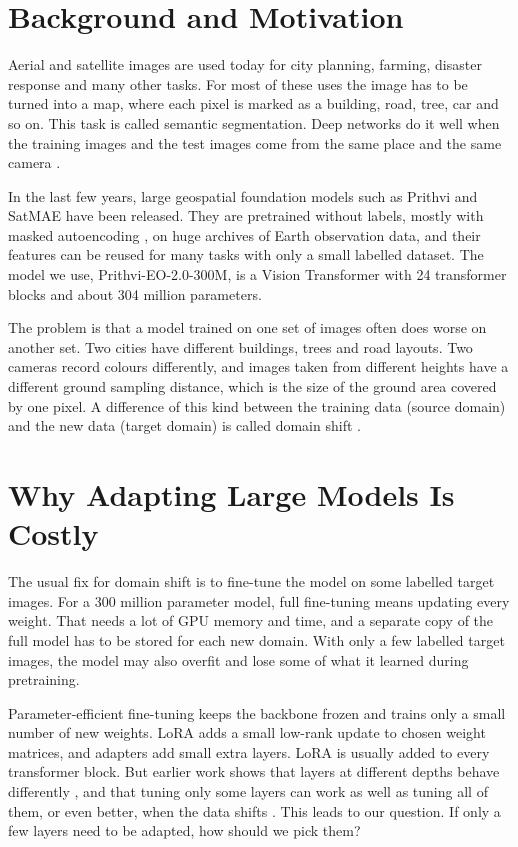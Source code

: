 \documentclass[11pt,a4paper]{report}
\begin{document}
\section{Background and Motivation}

Aerial and satellite images are used today for city planning, farming, disaster response and many other tasks. For most of these uses the image has to be turned into a map, where each pixel is marked as a building, road, tree, car and so on. This task is called semantic segmentation. Deep networks do it well when the training images and the test images come from the same place and the same camera \cite{long2015fully}.

In the last few years, large geospatial foundation models such as Prithvi \cite{jakubik2023foundation,szwarcman2024prithvi} and SatMAE \cite{cong2022satmae} have been released. They are pretrained without labels, mostly with masked autoencoding \cite{he2022masked}, on huge archives of Earth observation data, and their features can be reused for many tasks with only a small labelled dataset. The model we use, Prithvi-EO-2.0-300M, is a Vision Transformer \cite{dosovitskiy2021image} with 24 transformer blocks and about 304 million parameters.

The problem is that a model trained on one set of images often does worse on another set. Two cities have different buildings, trees and road layouts. Two cameras record colours differently, and images taken from different heights have a different ground sampling distance, which is the size of the ground area covered by one pixel. A difference of this kind between the training data (source domain) and the new data (target domain) is called domain shift \cite{bendavid2010theory,tuia2016domain}.

\section{Why Adapting Large Models Is Costly}

The usual fix for domain shift is to fine-tune the model on some labelled target images. For a 300 million parameter model, full fine-tuning means updating every weight. That needs a lot of GPU memory and time, and a separate copy of the full model has to be stored for each new domain. With only a few labelled target images, the model may also overfit and lose some of what it learned during pretraining.

Parameter-efficient fine-tuning keeps the backbone frozen and trains only a small number of new weights. LoRA \cite{hu2022lora} adds a small low-rank update to chosen weight matrices, and adapters \cite{houlsby2019parameter} add small extra layers. LoRA is usually added to every transformer block. But earlier work shows that layers at different depths behave differently \cite{yosinski2014transferable}, and that tuning only some layers can work as well as tuning all of them, or even better, when the data shifts \cite{lee2023surgical}. This leads to our question. If only a few layers need to be adapted, how should we pick them?
\end{document}
